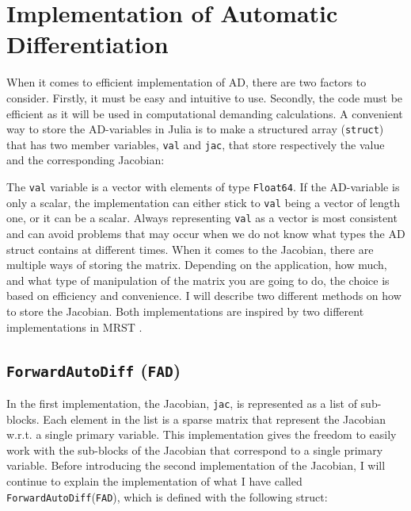 \section{Implementation of Automatic Differentiation}
\label{sec:ImplementationAD}
When it comes to efficient implementation of AD, there are two factors to consider. Firstly, it must be easy and intuitive to use. Secondly, the code must be efficient as it will be used in computational demanding calculations. A convenient way to store the AD-variables in Julia is to make a structured array (\texttt{struct}) that has two member variables, \texttt{val} and \texttt{jac}, that store respectively the value and the corresponding Jacobian: 
 
The \texttt{val} variable is a vector with elements of type \texttt{Float64}. If the AD-variable is only a scalar, the implementation can either stick to \texttt{val} being a vector of length one, or it can be a scalar. Always representing \texttt{val} as a vector is most consistent and can avoid problems that may occur when we do not know what types the AD struct contains at different times. When it comes to the Jacobian, there are multiple ways of storing the matrix. Depending on the application, how much, and what type of manipulation of the matrix you are going to do, the choice is based on efficiency and convenience. I will describe two different methods on how to store the Jacobian. Both implementations are inspired by two different implementations in MRST \citep{lieMrstUrl}. 

\subsection{\texttt{ForwardAutoDiff} (\texttt{FAD})}
\label{sec:FAD}
In the first implementation, the Jacobian, \texttt{jac}, is represented as a list of sub-blocks. Each element in the list is a sparse matrix that represent the Jacobian w.r.t. a single primary variable. This implementation gives the freedom to easily work with the sub-blocks of the Jacobian that correspond to a single primary variable. Before introducing the second implementation of the Jacobian, I will continue to explain the implementation of what I have called \texttt{ForwardAutoDiff}(\texttt{FAD}), which is defined with the following struct:



